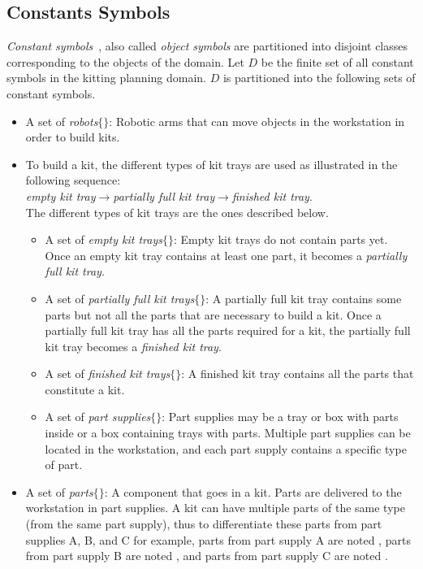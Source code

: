 \subsection{Constants Symbols}\label{constant_symbol}

{\textit{Constant symbols}}~\cite{NAU.2004}, also called {\textit{object symbols}} are partitioned into disjoint classes corresponding to the objects of the domain. Let $D$ be the finite set of all constant symbols in the kitting planning domain. $D$ is partitioned into the following sets of constant symbols.

\begin{itemize}
\item A set of {\textit{robots}}$\lbrace${}$\rbrace$: Robotic arms that can move objects in the workstation in order to build kits.
\item To build a kit, the different types of kit trays are used as illustrated in the following sequence:\\ \textit{empty kit tray}$\rightarrow$\textit{partially full kit tray}$\rightarrow$\textit{finished kit tray}.\\ The different types of kit trays are the ones described below.
\begin{itemize}
\item A set of {\textit{empty kit trays}}$\lbrace${}$\rbrace$: Empty kit trays do not contain parts yet. Once an empty kit tray contains at least one part, it becomes a \textit{partially full kit tray}.
\item A set of {\textit{partially full kit trays}}$\lbrace${}$\rbrace$: A partially full kit tray contains some parts but not all the parts that are necessary to build a kit. Once a partially full kit tray has all the parts required for a kit, the partially full kit tray becomes a \textit{finished kit tray}.
\item A set of {\textit{finished kit trays}}$\lbrace${}$\rbrace$: A finished kit tray contains all the parts that constitute a kit.
\item A set of {\textit{part supplies}}$\lbrace${}$\rbrace$: Part supplies may be a tray or box with parts inside or a box containing trays with parts. Multiple part supplies can be located in the workstation, and each part supply contains a specific type of part.
\end{itemize}
\item A set of {\textit{parts}}$\lbrace${}$\rbrace$: A component that goes in a kit. Parts are delivered to the workstation in part supplies. A kit can have multiple parts of the same type (from the same part supply), thus to differentiate these parts from part supplies A, B, and C for example, parts from part supply A are noted {}, parts from part supply B are noted {}, and parts from part supply C are noted {}.


\end{itemize}
